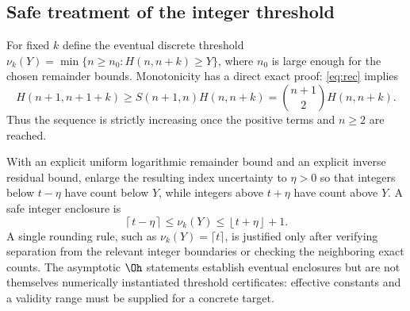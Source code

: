 \subsection{Safe treatment of the integer threshold}
For fixed $k$ define the eventual discrete threshold
$\nu_k(Y)=\min\{n\geq n_0:H(n,n+k)\geq Y\}$, where $n_0$ is large enough for the chosen remainder bounds. Monotonicity has a direct exact proof: \eqref{eq:rec} implies
\[
 H(n+1,n+1+k)\geq S(n+1,n)H(n,n+k)
      =\binom{n+1}{2}H(n,n+k).
\]
Thus the sequence is strictly increasing once the positive terms and $n\geq2$ are reached.

With an explicit uniform logarithmic remainder bound and an explicit inverse residual bound, enlarge the resulting index uncertainty to $\eta>0$ so that integers below $t-\eta$ have count below $Y$, while integers above $t+\eta$ have count above $Y$. A safe integer enclosure is
\[
 \left\lceil t-\eta\right\rceil\leq\nu_k(Y)
       \leq\left\lfloor t+\eta\right\rfloor+1.
\]
A single rounding rule, such as $\nu_k(Y)=\lceil t\rceil$, is justified only after verifying separation from the relevant integer boundaries or checking the neighboring exact counts. The asymptotic $\Oh$ statements establish eventual enclosures but are not themselves numerically instantiated threshold certificates: effective constants and a validity range must be supplied for a concrete target.
